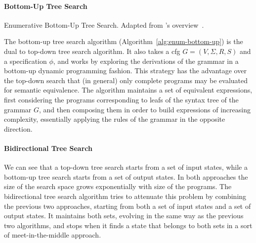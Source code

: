\paragraph{Bottom-Up Tree Search}
\label{sec:bottom-up-tree-search}

\begin{algorithm}
  \DontPrintSemicolon
  \LinesNotNumbered




  \caption{Enumerative Bottom-Up Tree Search.
    Adapted from \citeauthor{Gulwani2017}'s overview~\cite{Gulwani2017}.}
  \label{alg:enum-bottom-up}
\end{algorithm}

The bottom-up tree search algorithm (Algorithm~\ref{alg:enum-bottom-up}) is the
dual to top-down tree search algorithm.
It also takes a \gls{cfg} $G = (V, \Sigma{}, R, S)$ and a specification
$\phi{}$, and works by exploring the derivations of the grammar in a bottom-up
dynamic programming fashion.
This strategy has the advantage over the top-down search that (in general) only
complete programs may be evaluated for semantic equivalence.
The algorithm maintains a set of equivalent expressions, first considering the
programs corresponding to leafs of the syntax tree of the grammar $G$, and then
composing them in order to build expressions of increasing complexity,
essentially applying the rules of the grammar in the opposite direction.

\paragraph{Bidirectional Tree Search}
\label{sec:bidirectional-search}

We can see that a top-down tree search starts from a set of input states, while
a bottom-up tree search starts from a set of output states.
In both approaches the size of the search space grows exponentially with size of
the programs.
The bidirectional tree search algorithm tries to attenuate this problem by
combining the previous two approaches, starting from both a set of input states
and a set of output states.
It maintains both sets, evolving in the same way as the previous two
algorithms, and stops when it finds a state that belongs to both sets in a
sort of meet-in-the-middle approach.

